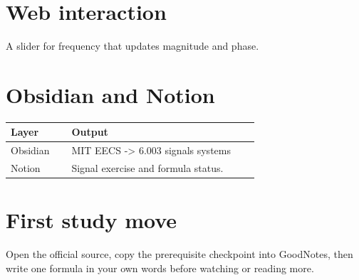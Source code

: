 \documentclass[11pt]{article}
\begin{document}
\section*{Web interaction}
A slider for frequency that updates magnitude and phase.

\section*{Obsidian and Notion}
\begin{tabular}{p{0.22\linewidth}p{0.68\linewidth}}
\toprule
Layer & Output \\
\midrule
Obsidian & MIT EECS -> 6.003 signals systems \\
Notion & Signal exercise and formula status. \\
\bottomrule
\end{tabular}

\section*{First study move}
Open the official source, copy the prerequisite checkpoint into GoodNotes, then write one formula in your own words before watching or reading more.
\end{document}

